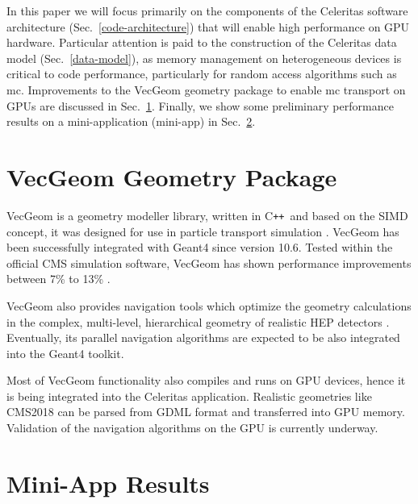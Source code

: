 \documentclass{webofc}
\newcommand{\Cpp}{C\texttt{++}\xspace}
\begin{document}

In this paper we will focus primarily on the components of the Celeritas
software architecture (Sec.~\ref{code-architecture}) that will enable high
performance on GPU hardware.  Particular attention is paid to the construction
of the Celeritas data model (Sec.~\ref{data-model}), as memory management on
heterogeneous devices is critical to code performance, particularly for random
access algorithms such as \ac{mc}.  Improvements to the VecGeom geometry package to enable \ac{mc} transport on GPUs are discussed in Sec.~\ref{sec:vecgeom}.  Finally, we show some preliminary performance results on a mini-application (mini-app) in Sec.~\ref{sec:miniapp}.



\section{VecGeom Geometry Package}
\label{sec:vecgeom}

VecGeom is a geometry modeller library, written in \Cpp\ and based on the SIMD
concept, it was designed for use in particle transport
simulation \cite{VecGeom:web}. VecGeom has been successfully integrated with Geant4
since version 10.6. Tested within the official CMS simulation software, VecGeom
has shown performance improvements between 7\% to 13\% \cite{Pedro:2019mkq}.

VecGeom also provides navigation tools which optimize the geometry calculations
in the complex, multi-level, hierarchical geometry of realistic HEP
detectors \cite{Wenzel:2020zyn}. Eventually, its parallel navigation algorithms
are expected to be also integrated into the Geant4 toolkit.

Most of VecGeom functionality also compiles and runs on GPU devices, hence it is
being integrated into the Celeritas application. Realistic geometries like
CMS2018 can be parsed from GDML format and transferred into GPU memory.
Validation of the navigation algorithms on the GPU is currently underway.


\section{Mini-App Results}
\label{sec:miniapp}
\end{document}
